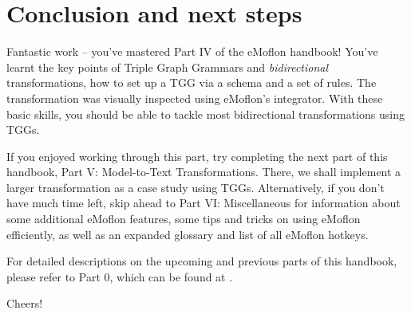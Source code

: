 \section{Conclusion and next steps}
\genHeader

\vspace{0.5cm}

Fantastic work -- you've mastered Part IV of the eMoflon handbook! You've learnt the key points of Triple Graph Grammars and \emph{bidirectional}
transformations, how to set up a TGG via a schema and a set of rules. The transformation was visually inspected using eMoflon's integrator. With these basic
skills, you should be able to tackle most bidirectional transformations using TGGs.

If you enjoyed working through this part, try completing the next part of this handbook, Part V: Model-to-Text Transformations. There, we shall implement a
larger transformation as a case study using TGGs. Alternatively, if you don't have much time left, skip ahead to Part VI: Miscellaneous for information about
some additional eMoflon features, some tips and tricks on using eMoflon efficiently, as well as an expanded glossary and list of all eMoflon hotkeys.

For detailed descriptions on the upcoming and previous parts of this handbook, please refer to Part 0, which can be found at \dlPartZero.

Cheers!
